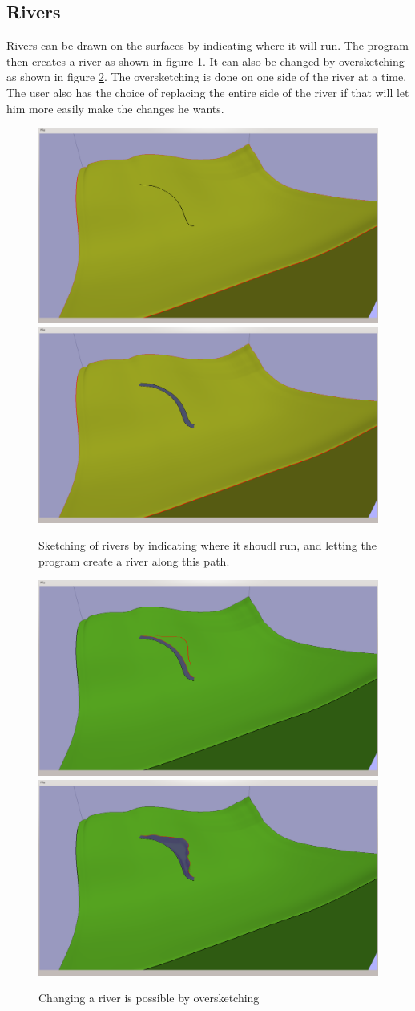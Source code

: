 \documentclass[a4paper,12pt]{report}
\begin{document}
\subsection{Rivers}
Rivers can be drawn on the surfaces by indicating where it will run. The program then creates a river as shown in figure \ref{fig:riverDraw}. It can also be changed by oversketching as shown in figure \ref{fig:riverChange}. The oversketching is done on one side of the river at a time. The user also has the choice of replacing the entire side of the river if that will let him more easily make the changes he wants.

\begin{figure}
\includegraphics[trim = 30mm 80mm 120mm 30mm, clip,width=.5\linewidth]{thesis/results/riverDraw.png}
\includegraphics[trim = 30mm 80mm 120mm 30mm, clip,width=.5\linewidth]{thesis/results/riverDrawn.png}
 \caption{Sketching of rivers by indicating where it shoudl run, and letting the program create a river along this path. }
 \label{fig:riverDraw}
\end{figure}

\begin{figure}
\includegraphics[trim = 30mm 80mm 120mm 30mm, clip,width=.5\linewidth]{thesis/results/riverChange.png}
\includegraphics[trim = 30mm 80mm 120mm 30mm, clip,width=.5\linewidth]{thesis/results/riverChanged.png}
 \caption{Changing a river is possible by oversketching }
 \label{fig:riverChange}
\end{figure}
\end{document}
